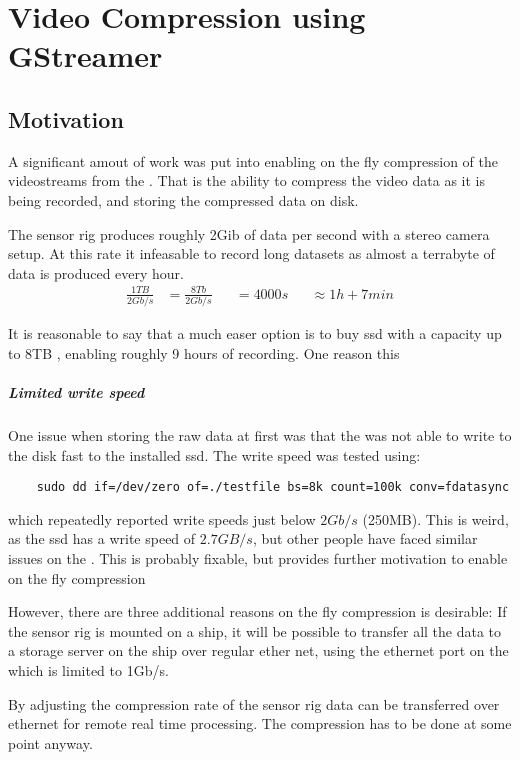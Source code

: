 \chapter{Video Compression using GStreamer}
\label{chap:gstreamer}

\section{Motivation}
A significant amout of work was put into enabling on the fly compression of the videostreams from the \sr.
That is the ability to compress the video data as it is being recorded, and storing the compressed data on disk.

The sensor rig produces roughly 2Gib of data per second with a stereo camera setup.
At this rate it infeasable to record long datasets as almost a terrabyte of data is produced every hour.
\begin{align}
    \frac{1TB}{2Gb/s} & = \frac{8Tb}{2Gb/s}
                      &                     & = 4000s
                      &                     & \approx 1h + 7min
\end{align}

It is reasonable to say that a much easer option is to buy \gls{ssd} with a capacity up to 8TB \cite{CorsairMP600PRO}, enabling roughly 9 hours of recording.
One reason this
\cite{microntechnologyMicron2300SSD2020}


\paragraph{Limited write speed}
One issue when storing the raw data at first was that the \jx was not able to write to the disk fast to the installed \gls{ssd}.
The write speed was tested using:
\begin{verbatim}
    sudo dd if=/dev/zero of=./testfile bs=8k count=100k conv=fdatasync
\end{verbatim}
which repeatedly reported write speeds just below $2Gb/s$ (250MB).
This is weird, as the \gls{ssd} has a write speed of $2.7GB/s$, but other people have faced similar issues on the \jx \cite{microntechnologyMicron2300SSD2020} \cite{dtyuImbalancedPerformanceRead2018}.
This is probably fixable, but provides further motivation to enable on the fly compression



However, there are three additional reasons on the fly compression is desirable:
If the sensor rig is mounted on a ship, it will be possible to transfer all the data to a storage server on the ship over regular ether net, using the ethernet port on the \jx which is limited to 1Gb/s.

By adjusting the compression rate of the sensor rig data can be transferred over ethernet for remote real time processing.
The compression has to be done at some point anyway.






